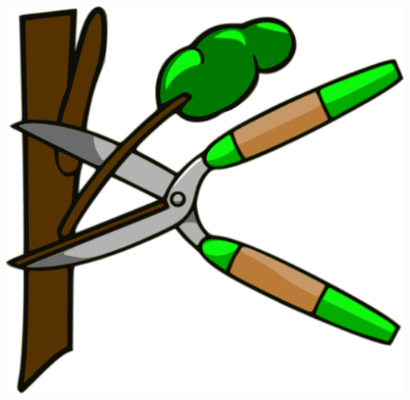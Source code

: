 \documentclass[10pt]{../sigplanconf}
\begin{document}
\newpage
\begin{center}
  \includegraphics[width=0.7\columnwidth]{../figures/pruning.pdf}
\end{center}




\end{document}
